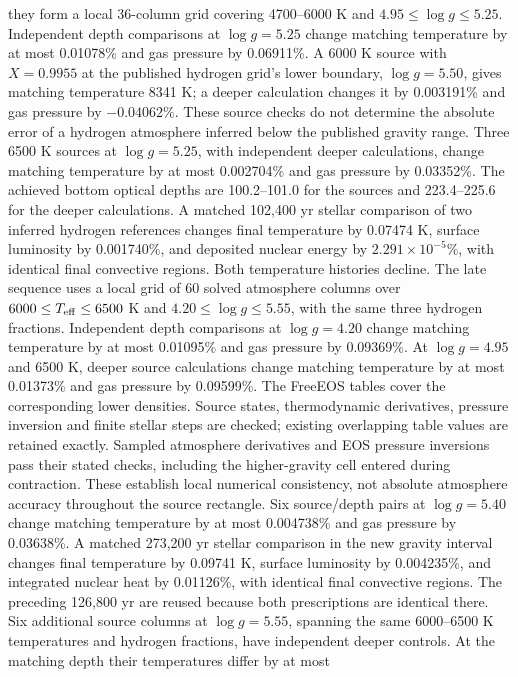 \documentclass[11pt,letterpaper]{article}
\begin{document}
they form a local 36-column grid covering 4700--6000 K and
$4.95\leq\log g\leq5.25$. Independent depth comparisons at $\log g=5.25$
change matching temperature by at most 0.01078\% and gas pressure by
0.06911\%. A 6000 K source with $X=0.9955$ at the published hydrogen grid's
lower boundary, $\log g=5.50$, gives matching temperature 8341 K;
a deeper calculation changes it by 0.003191\% and gas pressure by
$-0.04062\%$. These source checks do not determine the absolute error
of a hydrogen atmosphere inferred below the published gravity range.
Three 6500 K sources at $\log g=5.25$, with independent deeper
calculations, change matching temperature by at most 0.002704\% and gas
pressure by 0.03352\%. The achieved bottom optical depths are 100.2--101.0
for the sources and 223.4--225.6 for the deeper calculations.
A matched 102,400 yr stellar comparison of two inferred hydrogen references
changes final temperature by 0.07474 K, surface luminosity by 0.001740\%,
and deposited nuclear energy by $2.291\times10^{-5}\%$, with identical final
convective regions. Both temperature histories decline.
The late sequence uses a local grid of 60 solved atmosphere columns over
$6000\leq T_{\rm eff}\leq6500$ K and $4.20\leq\log g\leq5.55$,
with the same three hydrogen fractions. Independent depth comparisons at
$\log g=4.20$ change matching temperature by at most 0.01095\% and gas
pressure by 0.09369\%. At $\log g=4.95$ and 6500 K, deeper source
calculations change matching temperature by at most 0.01373\% and gas pressure
by 0.09599\%. The FreeEOS tables cover the corresponding lower densities. Source states, thermodynamic
derivatives, pressure inversion and finite stellar steps are checked;
existing overlapping table values are retained exactly. Sampled atmosphere derivatives and EOS pressure inversions
pass their stated checks, including the higher-gravity cell entered during
contraction. These establish local numerical consistency,
not absolute atmosphere accuracy throughout the source rectangle.
Six source/depth pairs at $\log g=5.40$ change matching temperature by at
most 0.004738\% and gas pressure by 0.03638\%. A matched 273,200 yr
stellar comparison in the new gravity interval changes final temperature
by 0.09741 K, surface luminosity by 0.004235\%, and integrated nuclear heat
by 0.01126\%, with identical final convective regions. The preceding
126,800 yr are reused because both prescriptions are identical there.
Six additional source columns at $\log g=5.55$, spanning the same
6000--6500 K temperatures and hydrogen fractions, have independent deeper
controls. At the matching depth their temperatures differ by at most
\end{document}
